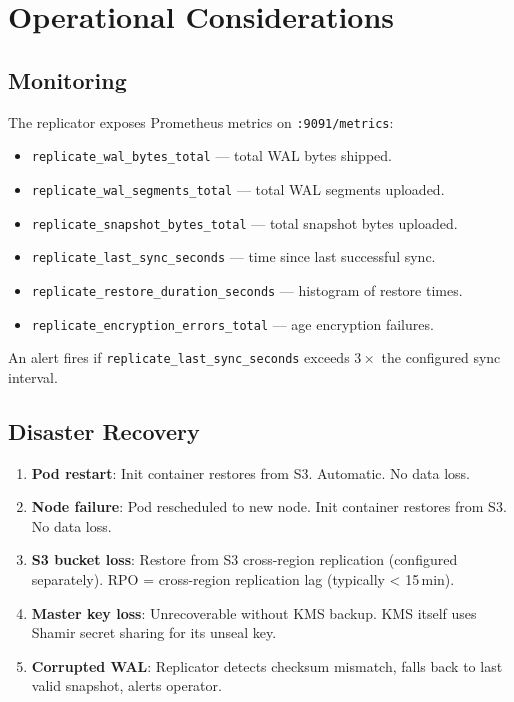 \section{Operational Considerations}
\label{sec:ops}

\subsection{Monitoring}

The replicator exposes Prometheus metrics on \texttt{:9091/metrics}:

\begin{itemize}[nosep]
  \item \texttt{replicate\_wal\_bytes\_total} --- total WAL bytes shipped.
  \item \texttt{replicate\_wal\_segments\_total} --- total WAL segments
    uploaded.
  \item \texttt{replicate\_snapshot\_bytes\_total} --- total snapshot
    bytes uploaded.
  \item \texttt{replicate\_last\_sync\_seconds} --- time since last
    successful sync.
  \item \texttt{replicate\_restore\_duration\_seconds} --- histogram
    of restore times.
  \item \texttt{replicate\_encryption\_errors\_total} --- age
    encryption failures.
\end{itemize}

An alert fires if \texttt{replicate\_last\_sync\_seconds} exceeds
$3\times$ the configured sync interval.

\subsection{Disaster Recovery}

\begin{enumerate}[nosep]
  \item \textbf{Pod restart}: Init container restores from S3.
    Automatic. No data loss.
  \item \textbf{Node failure}: Pod rescheduled to new node. Init
    container restores from S3. No data loss.
  \item \textbf{S3 bucket loss}: Restore from S3 cross-region
    replication (configured separately). RPO = cross-region
    replication lag (typically < 15\,min).
  \item \textbf{Master key loss}: Unrecoverable without KMS backup.
    KMS itself uses Shamir secret sharing for its unseal key.
  \item \textbf{Corrupted WAL}: Replicator detects checksum mismatch,
    falls back to last valid snapshot, alerts operator.
\end{enumerate}

